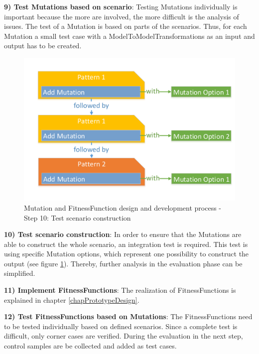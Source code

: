 \textbf{9) Test \glspl{Mutation} based on scenario}: Testing \glspl{Mutation} individually is important because the more are involved, the more difficult is the analysis of issues. The test of a \gls{Mutation} is based on parts of the scenarios. Thus, for each \gls{Mutation} a small test case with a \glspl{ModelToModelTransformation} as an input and output has to be created.

\begin{figure}[!ht]
	\centering
	\includegraphics[scale=0.5, trim=0cm 1cm 0cm 1cm, clip=true]{Images/MutationAndFitnessFunctionDesignProcess-Step10.pdf} 
	\caption{\Gls{Mutation} and \gls{FitnessFunction} design and development process - Step 10: Test scenario construction}
	\label{figMutationAndFitnessFunctionDesignProcess-Step10}
\end{figure}

\textbf{10) Test scenario construction}: In order to ensure that the \glspl{Mutation} are able to construct the whole scenario, an integration test is required. This test is using specific \gls{Mutation} options, which represent one possibility to construct the output (see figure \ref{figMutationAndFitnessFunctionDesignProcess-Step10}). Thereby, further analysis in the evaluation phase can be simplified.

\textbf{11) Implement \glspl{FitnessFunction}}: The realization of \glspl{FitnessFunction} is explained in chapter \ref{chapPrototypeDesign}.

\textbf{12) Test \glspl{FitnessFunction} based on \glspl{Mutation}}: The \glspl{FitnessFunction} need to be tested individually based on defined scenarios. Since a complete test is difficult, only corner cases are verified. During the evaluation in the next step, control samples are be collected and added as test cases.

